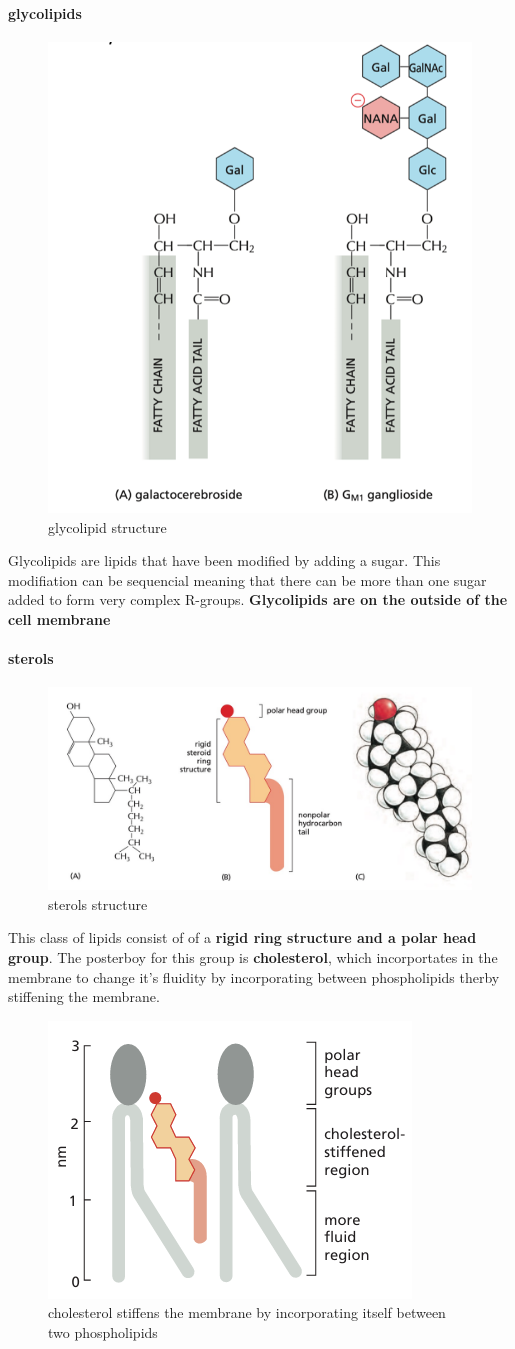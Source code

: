 \documentclass[../main.tex]{subfiles}
\begin{document}
        
        \paragraph{glycolipids}
        \begin{figure}[H]
            \centering
            \includegraphics[width=0.3\linewidth]{glycolipids.png}
            \caption{glycolipid structure}
            \label{fig:enter-label}
        \end{figure}
        Glycolipids are lipids that have been modified by adding a sugar. This modifiation can be sequencial meaning that there can be more than one sugar added to form very complex R-groups. \textbf{Glycolipids are on the outside of the cell membrane}

    
        \paragraph{sterols}
        \begin{figure}[H]
            \centering
            \includegraphics[width=0.5\linewidth]{sterols.png}
            \caption{sterols structure}
            \label{fig:enter-label}
        \end{figure}
        This class of lipids consist of of a \textbf{rigid ring structure and a polar head group}. The posterboy for this group is \textbf{cholesterol}, which incorportates in the membrane to change it's fluidity by incorporating between phospholipids therby stiffening the membrane.
        \begin{figure}[H]
            \centering
            \includegraphics[width=0.3\linewidth]{cholesterolStiffening.png}
            \caption{cholesterol stiffens the membrane by incorporating itself between two phospholipids}
            \label{fig:enter-label}
        \end{figure}
\end{document}
